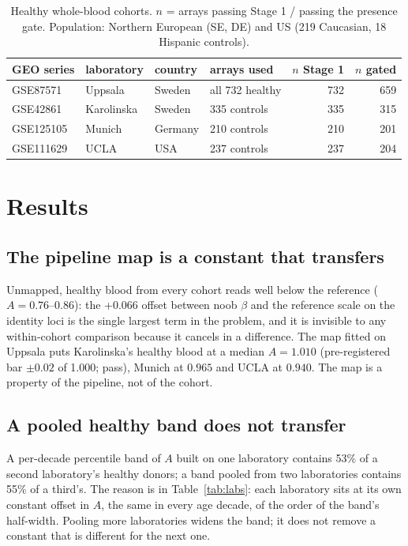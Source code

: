 \documentclass[12pt,a4paper]{article}
\begin{document}
\begin{table}[H]
\centering\small
\caption{Healthy whole-blood cohorts. $n$ = arrays passing Stage 1 / passing the presence gate. Population: Northern European (SE, DE) and US (219 Caucasian, 18 Hispanic controls).}
\label{tab:cohorts}
\begin{tabular}{llllrr}
\toprule
GEO series & laboratory & country & arrays used & $n$ Stage 1 & $n$ gated\\
\midrule
GSE87571 & Uppsala & Sweden & all 732 healthy & 732 & 659\\
GSE42861 & Karolinska & Sweden & 335 controls & 335 & 315\\
GSE125105 & Munich & Germany & 210 controls & 210 & 201\\
GSE111629 & UCLA & USA & 237 controls & 237 & 204\\
\bottomrule
\end{tabular}
\end{table}

\section{Results}
\label{sec:results}

\subsection{The pipeline map is a constant that transfers}
Unmapped, healthy blood from every cohort reads well below the reference ($A = 0.76$--$0.86$): the +0.066 offset between noob $\beta$ and the reference scale on the identity loci is the single largest term in the problem, and it is invisible to any within-cohort comparison because it cancels in a difference. The map fitted on Uppsala puts Karolinska's healthy blood at a median $A = 1.010$ (pre-registered bar $\pm 0.02$ of 1.000; pass), Munich at $0.965$ and UCLA at $0.940$. The map is a property of the pipeline, not of the cohort.

\subsection{A pooled healthy band does not transfer}
A per-decade percentile band of $A$ built on one laboratory contains 53\% of a second laboratory's healthy donors; a band pooled from two laboratories contains 55\% of a third's. The reason is in Table~\ref{tab:labs}: each laboratory sits at its own constant offset in $A$, the same in every age decade, of the order of the band's half-width. Pooling more laboratories widens the band; it does not remove a constant that is different for the next one.
\end{document}
